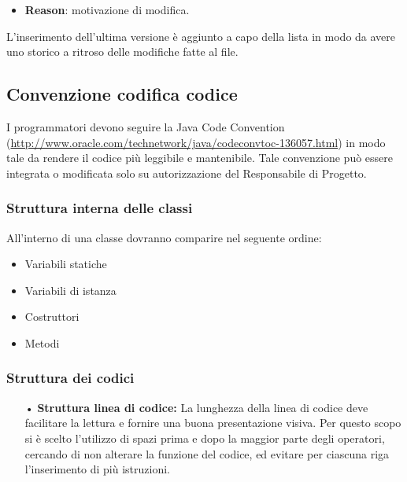 {{\begin{itemize}
\begin{itemize}
				\begin{itemize}
					\item []\texttt{[+]} indica che il metodo è stato creato; 
					\item []\texttt{[-]} indica che il metodo è stato eliminato;
					\item []\texttt{[x]} indica che il metodo ha subito un cambiamento.
				\end{itemize}
				\item \textbf{Reason}: motivazione di modifica.
			\end{itemize}
			L'inserimento dell'ultima versione è aggiunto a capo della lista  in modo da avere uno storico a ritroso delle modifiche fatte al file.
		\end{itemize} 
	}

	\subsection{Convenzione codifica codice} {
		I programmatori devono seguire la Java Code Convention (\url{http://www.oracle.com/technetwork/java/codeconvtoc-136057.html}) in modo tale da rendere il codice più leggibile e mantenibile.
		Tale convenzione può essere integrata o modificata solo su autorizzazione del Responsabile di Progetto.
		
		\subsubsection{Struttura interna delle classi}{
			All’interno di una classe dovranno comparire nel seguente ordine:
			\begin{itemize}
				\item Variabili statiche
				\item Variabili di istanza
				\item Costruttori
				\item Metodi
			\end{itemize}
		}
		
		\subsubsection{Struttura dei codici}{
		
			\begin{itemize}
			
		        \item[•]	 { \textbf{Struttura linea di codice:} La lunghezza della
		        linea di codice deve facilitare la lettura e fornire una buona
		        presentazione visiva. Per questo scopo  si è scelto l’utilizzo di
		        spazi prima e dopo la maggior parte degli operatori, cercando di non
		        alterare la funzione del codice, ed evitare per ciascuna riga
		        l’inserimento di più istruzioni.
		        }
			

\end{itemize}}}}
